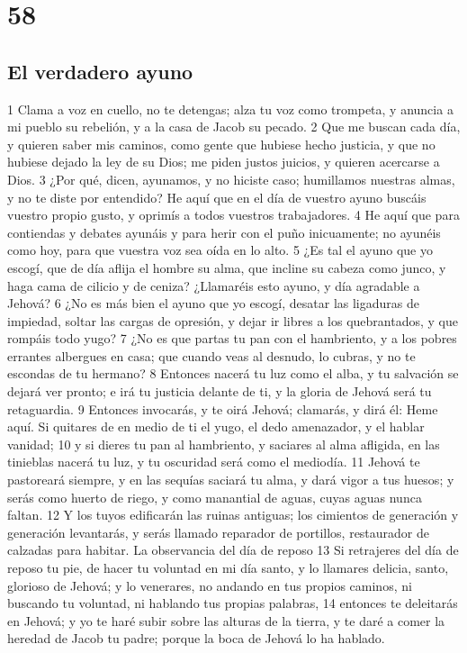 \chapter{58}

\section*{El verdadero ayuno}

1 Clama a voz en cuello, no te detengas; alza tu voz como trompeta, y anuncia a mi pueblo su rebelión, y a la casa de Jacob su pecado.
2 Que me buscan cada día, y quieren saber mis caminos, como gente que hubiese hecho justicia, y que no hubiese dejado la ley de su Dios; me piden justos juicios, y quieren acercarse a Dios.
3 ¿Por qué, dicen, ayunamos, y no hiciste caso; humillamos nuestras almas, y no te diste por entendido? He aquí que en el día de vuestro ayuno buscáis vuestro propio gusto, y oprimís a todos vuestros trabajadores.
4 He aquí que para contiendas y debates ayunáis y para herir con el puño inicuamente; no ayunéis como hoy, para que vuestra voz sea oída en lo alto.
5 ¿Es tal el ayuno que yo escogí, que de día aflija el hombre su alma, que incline su cabeza como junco, y haga cama de cilicio y de ceniza? ¿Llamaréis esto ayuno, y día agradable a Jehová?
6 ¿No es más bien el ayuno que yo escogí, desatar las ligaduras de impiedad, soltar las cargas de opresión, y dejar ir libres a los quebrantados, y que rompáis todo yugo?
7 ¿No es que partas tu pan con el hambriento, y a los pobres errantes albergues en casa; que cuando veas al desnudo, lo cubras, y no te escondas de tu hermano?
8 Entonces nacerá tu luz como el alba, y tu salvación se dejará ver pronto; e irá tu justicia delante de ti, y la gloria de Jehová será tu retaguardia.
9 Entonces invocarás, y te oirá Jehová; clamarás, y dirá él: Heme aquí. Si quitares de en medio de ti el yugo, el dedo amenazador, y el hablar vanidad;
10 y si dieres tu pan al hambriento, y saciares al alma afligida, en las tinieblas nacerá tu luz, y tu oscuridad será como el mediodía.
11 Jehová te pastoreará siempre, y en las sequías saciará tu alma, y dará vigor a tus huesos; y serás como huerto de riego, y como manantial de aguas, cuyas aguas nunca faltan.
12 Y los tuyos edificarán las ruinas antiguas; los cimientos de generación y generación levantarás, y serás llamado reparador de portillos, restaurador de calzadas para habitar.
La observancia del día de reposo
13 Si retrajeres del día de reposo tu pie, de hacer tu voluntad en mi día santo, y lo llamares delicia, santo, glorioso de Jehová; y lo venerares, no andando en tus propios caminos, ni buscando tu voluntad, ni hablando tus propias palabras,
14 entonces te deleitarás en Jehová; y yo te haré subir sobre las alturas de la tierra, y te daré a comer la heredad de Jacob tu padre; porque la boca de Jehová lo ha hablado.

